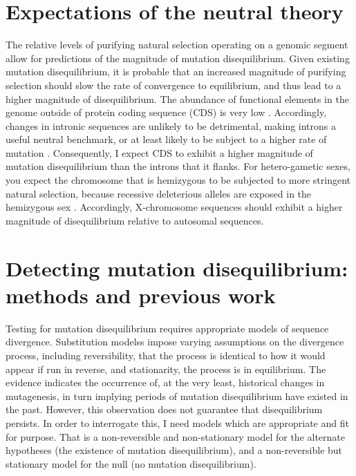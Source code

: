 \section{Expectations of the neutral theory}

The relative levels of purifying natural selection operating on a genomic segment allow for predictions of the magnitude of mutation disequilibrium. Given existing mutation disequilibrium, it is probable that an increased magnitude of purifying selection should slow the rate of convergence to equilibrium, and thus lead to a higher magnitude of disequilibrium. The abundance of functional elements in the genome outside of protein coding sequence (CDS) is very low \citep{Graur2013OnENCODE}. Accordingly, changes in intronic sequences are unlikely to be detrimental, making introns a useful neutral benchmark, or at least likely to be subject to a higher rate of mutation \citep{Graur2013OnENCODE}. Consequently, I expect CDS to exhibit a higher magnitude of mutation disequilibrium than the introns that it flanks. For hetero-gametic sexes, you expect the chromosome that is \gls{hemizygous} to be subjected to more stringent natural selection, because recessive deleterious alleles are exposed in the hemizygous sex \citep{Charlesworth1987TheAutosomes}. Accordingly, X-chromosome sequences should exhibit a higher magnitude of disequilibrium relative to autosomal sequences. 

\section{Detecting mutation disequilibrium: methods and previous work}

Testing for mutation disequilibrium requires appropriate \gls{models} of sequence divergence. \Glspl{Substitution models} impose varying assumptions on the divergence process, including reversibility, that the process is identical to how it would appear if run in reverse, and \gls{stationarity}, the process is in \gls{equilibrium}. The evidence indicates the occurrence of, at the very least, historical changes in mutagenesis, in turn implying periods of mutation disequilibrium have existed in the past. However, this observation does not guarantee that disequilibrium persists. In order to interrogate this, I need models which are appropriate and fit for purpose. That is a non-reversible and non-stationary model for the alternate hypotheses (the existence of mutation disequilibrium), and a non-reversible but stationary model for the null (no mutation disequilibrium). 

